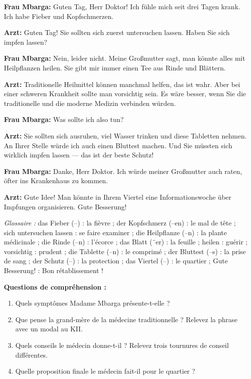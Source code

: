 \documentclass[11pt]{article}
\begin{document}
\begin{textebox}
\textbf{Frau Mbarga:} Guten Tag, Herr Doktor! Ich fühle mich seit drei Tagen krank. Ich habe Fieber und Kopfschmerzen.

\textbf{Arzt:} Guten Tag! Sie sollten sich zuerst untersuchen lassen. Haben Sie sich impfen lassen?

\textbf{Frau Mbarga:} Nein, leider nicht. Meine Großmutter sagt, man könnte alles mit Heilpflanzen heilen. Sie gibt mir immer einen Tee aus Rinde und Blättern.

\textbf{Arzt:} Traditionelle Heilmittel können manchmal helfen, das ist wahr. Aber bei einer schweren Krankheit sollte man vorsichtig sein. Es wäre besser, wenn Sie die traditionelle und die moderne Medizin verbinden würden.

\textbf{Frau Mbarga:} Was sollte ich also tun?

\textbf{Arzt:} Sie sollten sich ausruhen, viel Wasser trinken und diese Tabletten nehmen. An Ihrer Stelle würde ich auch einen Bluttest machen. Und Sie müssten sich wirklich impfen lassen — das ist der beste Schutz!

\textbf{Frau Mbarga:} Danke, Herr Doktor. Ich würde meiner Großmutter auch raten, öfter ins Krankenhaus zu kommen.

\textbf{Arzt:} Gute Idee! Man könnte in Ihrem Viertel eine Informationswoche über Impfungen organisieren. Gute Besserung!

\emph{Glossaire :} das Fieber (–) : la fièvre ; der Kopfschmerz (–en) : le mal de tête ; sich untersuchen lassen : se faire examiner ; die Heilpflanze (–n) : la plante médicinale ; die Rinde (–n) : l'écorce ; das Blatt (¨er) : la feuille ; heilen : guérir ; vorsichtig : prudent ; die Tablette (–n) : le comprimé ; der Bluttest (–s) : la prise de sang ; der Schutz (–) : la protection ; das Viertel (–) : le quartier ; Gute Besserung! : Bon rétablissement !
\end{textebox}

\textbf{Questions de compréhension :}

\begin{enumerate}
\item Quels symptômes Madame Mbarga présente-t-elle ?
\item Que pense la grand-mère de la médecine traditionnelle ? Relevez la phrase avec un modal au KII.
\item Quels conseils le médecin donne-t-il ? Relevez trois tournures de conseil différentes.
\item Quelle proposition finale le médecin fait-il pour le quartier ?
\end{enumerate}
\end{document}
